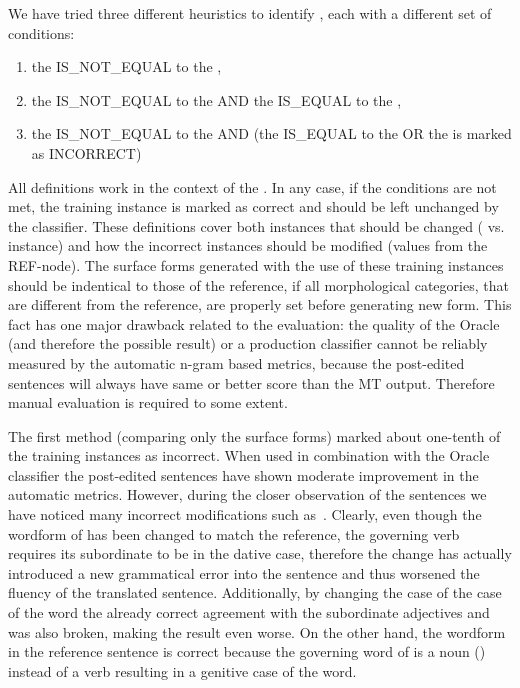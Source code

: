 We have tried three different heuristics to identify , each with a different set of conditions:
\begin{enumerate}
    \item the  IS\_NOT\_EQUAL to the ,
    \item the  IS\_NOT\_EQUAL to the  AND the  IS\_EQUAL to the ,
    \item the  IS\_NOT\_EQUAL to the  AND (the  IS\_EQUAL to the 
        OR the  is marked as INCORRECT)
\end{enumerate}
All definitions work in the context of the . In any case, if the conditions
are not met, the training instance is marked as correct and should be left unchanged by the classifier.
These definitions cover both instances that should be changed ( vs.  instance)
and how the incorrect instances should be modified (values from the REF-node). The surface forms
generated with the use of these training instances should be indentical to those of the reference,
if all morphological categories, that are different from the reference, are properly set before generating new form.
This fact has one major drawback related to the evaluation:
the quality of the Oracle (and therefore the 
possible result) or a production classifier cannot be reliably measured by the automatic n-gram based metrics, because the post-edited
sentences will always have same or better score than the MT output. Therefore manual evaluation is required
to some extent.

The first method (comparing only the surface forms) marked about one-tenth of the training instances as incorrect. When used in combination
with the Oracle classifier the post-edited sentences have shown moderate improvement in the automatic metrics.
However, during the closer observation of the sentences we have noticed many incorrect modifications such as~.
Clearly, even though the wordform of  has been changed to match the reference,
the governing verb  requires its subordinate to be in the dative case, therefore the change
has actually introduced a new grammatical error into the sentence and thus worsened
the fluency of the translated sentence. Additionally, by changing the case of the
case of the word  the already correct agreement with the subordinate adjectives
 and  was also broken, making the result even worse. On the other hand,
the wordform in the reference sentence is correct because the governing word of 
is a noun () instead of a verb resulting in a genitive case of the word.

